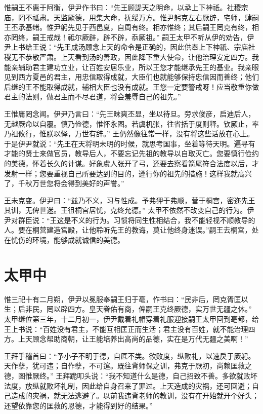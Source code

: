 \documentclass[a4paper,12pt,UTF8,twoside]{ctexbook}
\begin{document}
惟嗣王不惠于阿衡，伊尹作书曰：“先王顾諟天之明命，以承上下神祇。社稷宗庙，罔不祗肃。天监厥德，用集大命，抚绥万方。惟尹躬克左右厥辟，宅师，肆嗣王丕承基绪。惟尹躬先见于西邑夏，自周有终。相亦惟终；其后嗣王罔克有终，相亦罔终，嗣王戒哉！祗尔厥辟，辟不辟，忝厥祖。”
嗣王太甲不听从伊的劝告，伊尹上书给王说：“先王成汤顾念上天的命令是正确的，因此供奉上下神祇、宗庙社稷无不恭敬严肃。上天看到汤的善政，因此降下重大使命，让他治理安定四方。我能亲辅助君主建功立业，让百姓安居乐业，所以王您才能继承先王的基业。我亲眼见到西方夏邑的君主，用忠信取得成就，大臣们也就能够保持忠信因而善终；他们后继的王不能取得成就，辅相大臣也没有成就。王您一定要警戒呀！应当敬重你做君主的法则，做君主而不尽君道，将会羞辱自己的祖先。”

王惟庸罔念闻。伊尹乃言曰：“先王昧爽丕显，坐以待旦。旁求俊彦，启迪后人，无越厥命以自覆。慎乃俭德，惟怀永图。若虞机张，往省括于度则释。钦厥止，率乃祖攸行，惟朕以怿，万世有辞。”
王仍然像往常一样，没有将这些话放在心上。于是伊尹就说：“先王在天将明未明的时候，就思考国事，坐着等待天明。遍寻有才能的贤士来做官员，教导后人，不要忘记先祖的教导以自取灭亡。您要慎行俭约的美德，怀着长久的计谋。好象虞人张开了弓，还要去察看箭尾符合法度以后，才发射一样；您要重视自己所要达到的目的，遵行你的祖先的措施！这样我就高兴了，千秋万世您将会得到美好的声誉。”

王未克变。伊尹曰：“兹乃不义，习与性成。予弗狎于弗顺，营于桐宫，密迩先王其训，无俾世迷。王徂桐宫居忧，克终允德。”
太甲不依然不改变自己的行为。伊尹对群臣说：“王这是不义的行为。习惯将同生性相结合，我不能轻视不顺教导的人。要在桐营建造宫殿，让他聆听先王的教诲，莫让他终身迷误。”嗣王去桐宫，处在忧伤的环境，能够成就诚信的美德。

\chapter{太甲中}

惟三祀十有二月朔，伊尹以冕服奉嗣王归于亳，作书曰：“民非后，罔克胥匡以生；后非民，罔以辟四方。皇天眷佑有商，俾嗣王克终厥德，实万世无疆之休。”
太甲继位第三年，十二月初一，伊尹戴着礼帽穿着礼服迎接嗣王太甲回到亳都，给王上书说：“百姓没有君主，不能互相匡正而生活；君主没有百姓，就不能治理四方。上天顾念帮助商朝，让王能培养出高尚的品德，实在是万代无疆之美啊！”

王拜手稽首曰：“予小子不明于德，自厎不类。欲败度，纵败礼，以速戾于厥躬。天作孽，犹可违；自作孽，不可逭。既往背师保之训，弗克于厥初，尚赖匡救之德，图惟厥终。”
王拜跪叩头说：“我不知道什么是德，自己招致不善。多欲就败坏法度，放纵就败坏礼制，因此给自身召来了罪过。上天造成的灾祸，还可回避；自己造成的灾祸，就无法逃避了。以前我违背老师的教训，没有在开始就开个好头；还望依靠您的匡救的恩德，才能得到好的结果。”
\end{document}

